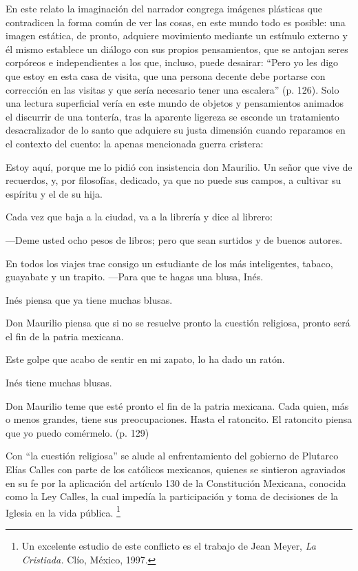 \documentclass[14pt,twoside,final]{extbook} %
\let\oldfootnote\footnote
\renewcommand\footnote[1]{%
\oldfootnote{\hspace{1mm}#1}}
\begin{document}
En este relato la imaginación del narrador congrega imágenes plásticas que contradicen la forma común de ver las cosas, en este mundo todo es posible: una imagen estática, de pronto, adquiere movimiento mediante un estímulo externo y él mismo establece un diálogo con sus propios pensamientos, que se antojan seres corpóreos e independientes a los que, incluso, puede desairar: ``Pero yo les digo que estoy en esta casa de visita, que una persona decente debe portarse con corrección en las visitas y que sería necesario tener una escalera'' (p. 126). Solo una lectura superficial vería en este mundo de objetos y pensamientos animados el discurrir de una tontería, tras la aparente ligereza se esconde un tratamiento desacralizador de lo santo que adquiere su justa dimensión cuando reparamos en el contexto del cuento: la apenas mencionada guerra cristera:
\begin{quoting}
Estoy aquí, porque me lo pidió con insistencia don Maurilio. Un señor que vive de recuerdos, y, por filosofías, dedicado, ya que no puede sus campos, a cultivar su espíritu y el de su hija.

Cada vez que baja a la ciudad, va a la librería y dice al librero:

---Deme usted ocho pesos de libros; pero que sean surtidos y de buenos autores.

En todos los viajes trae consigo un estudiante de los más inteligentes, tabaco, guayabate y un trapito. ---Para que te hagas una blusa, Inés.

Inés piensa que ya tiene muchas blusas.

Don Maurilio piensa que si no se resuelve pronto la cuestión religiosa, pronto será el fin de la patria mexicana.

Este golpe que acabo de sentir en mi zapato, lo ha dado un ratón.

Inés tiene muchas blusas.

Don Maurilio teme que esté pronto el fin de la patria mexicana. Cada quien, más o menos grandes, tiene sus preocupaciones. Hasta el ratoncito. El ratoncito piensa que yo puedo comérmelo. (p. 129)
\end{quoting}
Con ``la cuestión religiosa'' se alude al enfrentamiento del gobierno de Plutarco Elías Calles con parte de los católicos mexicanos, quienes se sintieron agraviados en su fe por la aplicación del artículo 130 de la Constitución Mexicana, conocida como la Ley Calles, la cual impedía la participación y toma de decisiones de la Iglesia en la vida pública.\footnote{Un excelente estudio de este conflicto es el trabajo de Jean Meyer, \emph{La Cristiada.} Clío, México, 1997.}
\end{document}

